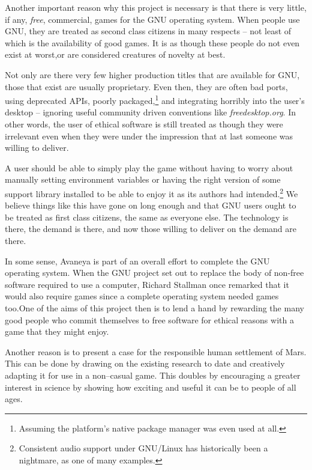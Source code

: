 Another important reason why this project is necessary is that there is very little, if any, {\it free}, commercial, games for the GNU operating system. When people use GNU, they are treated as second class citizens in many respects -- not least of which is the availability of good games. It is as though these people do not even exist at worst, or are considered creatures of novelty at best. 

Not only are there very few higher production titles that are available for GNU, those that exist are usually proprietary. Even then, they are often bad ports, using deprecated APIs, poorly packaged,\footnote{Assuming the platform's native package manager was even used at all.} and integrating horribly into the user's desktop -- ignoring useful community driven conventions like {\it freedesktop.org}. In other words, the user of ethical software is still treated as though they were irrelevant even when they were under the impression that at last someone was willing to deliver.

A user should be able to simply play the game without having to worry about manually setting environment variables or having the right version of some support library installed to be able to enjoy it as its authors had intended.\footnote{Consistent audio support under GNU/Linux has historically been a nightmare, as one of many examples.} We believe things like this have gone on long enough and that GNU users ought to be treated as first class citizens, the same as everyone else. The technology is there, the demand is there, and now those willing to deliver on the demand are there.

In some sense, Avaneya is part of an overall effort to complete the GNU operating system. When the GNU project set out to replace the body of non-free software required to use a computer, Richard Stallman once remarked that it would also require games since a complete operating system needed games too. One of the aims of this project then is to lend a hand by rewarding the many good people who commit themselves to free software for ethical reasons with a game that they might enjoy.

Another reason is to present a case for the responsible human settlement of Mars. This can be done by drawing on the existing research to date and creatively adapting it for use in a non--casual game. This doubles by encouraging a greater interest in science by showing how exciting and useful it can be to people of all ages.

